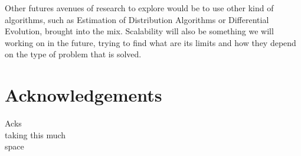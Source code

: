 \documentclass[runningheads]{llncs}
\begin{document}
Other futures avenues of research to explore would be to use other
kind of algorithms, such as Estimation of Distribution Algorithms or
Differential Evolution, brought into the mix. Scalability will also be
something we will working on in the future, trying to find what are
its limits and how they depend on the type of problem that is solved.


\section*{Acknowledgements}

Acks\\
taking this much\\
space


      
  
\end{document}
